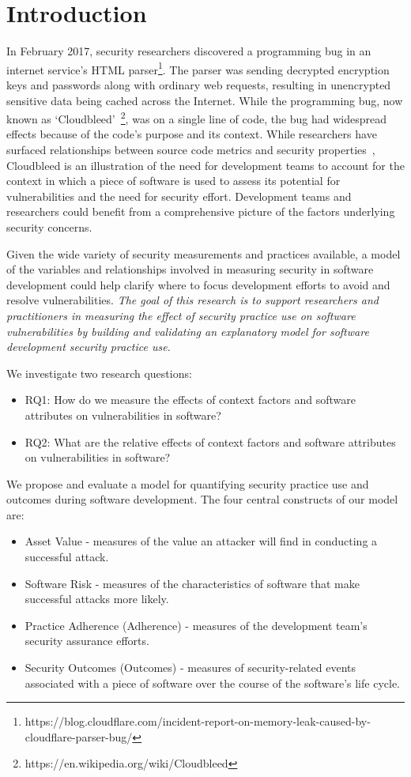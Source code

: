 \section{Introduction}
\label{sec:intro}

In February 2017, security researchers discovered a programming bug in an internet service's HTML parser\footnote{https://blog.cloudflare.com/incident-report-on-memory-leak-caused-by-cloudflare-parser-bug/}. The parser was sending decrypted encryption keys and passwords along with ordinary web requests, resulting in unencrypted sensitive data being cached across the Internet. While the programming bug, now known as `Cloudbleed'~\footnote{https://en.wikipedia.org/wiki/Cloudbleed}, was on a single line of code, the bug had widespread effects because of the code's purpose and its context.   While researchers have surfaced relationships between source code metrics and security properties~\cite{zimmerman2010searching,alhazmi2007measuring,meneely2013when,shin2011evaluating}, Cloudbleed is an illustration of the need for development teams to account for the context in which a piece of software is used to assess its potential for vulnerabilities and the need for security effort.  Development teams and researchers could benefit from a comprehensive picture of the factors underlying security concerns.

Given the wide variety of security measurements and practices available, a model of the variables and relationships involved in measuring security in software development could help clarify where to focus development efforts to avoid and resolve vulnerabilities. \textit{The goal of this research is to support researchers and practitioners in measuring the effect of security practice use on software vulnerabilities by building and validating an explanatory model for software development security practice use.}
 
We investigate two research questions:
\begin{itemize}
\item RQ1: How do we measure the effects of context factors and software attributes on vulnerabilities in software? 
\item RQ2: What are the relative effects of context factors and software attributes on vulnerabilities in software?
\end{itemize}

We propose and evaluate a model for quantifying security practice use and outcomes during software development. The four central constructs of our model are:
\begin{itemize}
	\item Asset Value - measures of the value an attacker will find in conducting a successful attack.
	\item Software Risk - measures of the characteristics of software that make successful attacks more likely.
	\item Practice Adherence (Adherence) - measures of the development team's security assurance efforts. 
	\item Security Outcomes (Outcomes) - measures of security-related events associated with a piece of software over the course of the software's life cycle.
\end{itemize}
	
